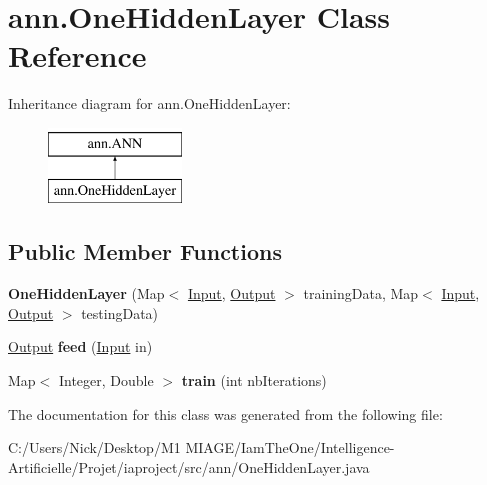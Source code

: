 \hypertarget{classann_1_1_one_hidden_layer}{}\section{ann.\+One\+Hidden\+Layer Class Reference}
\label{classann_1_1_one_hidden_layer}
Inheritance diagram for ann.\+One\+Hidden\+Layer\+:\begin{figure}[H]
\begin{center}
\leavevmode
\includegraphics[height=2.000000cm]{classann_1_1_one_hidden_layer}
\end{center}
\end{figure}
\subsection*{Public Member Functions}
\begin{DoxyCompactItemize}
\item 
\mbox{\label{classann_1_1_one_hidden_layer_a71b47ecdc9b1847d4758cf6614b4a3b0}} 
{\bfseries One\+Hidden\+Layer} (Map$<$ \hyperlink{classann_1_1_input}{Input}, \hyperlink{classann_1_1_output}{Output} $>$ training\+Data, Map$<$ \hyperlink{classann_1_1_input}{Input}, \hyperlink{classann_1_1_output}{Output} $>$ testing\+Data)
\item 
\mbox{\label{classann_1_1_one_hidden_layer_a319db2404483dd4158a7e9266b68f4a4}} 
\hyperlink{classann_1_1_output}{Output} {\bfseries feed} (\hyperlink{classann_1_1_input}{Input} in)
\item 
\mbox{\label{classann_1_1_one_hidden_layer_a054c8821610b8637e8fa3fa319df2d41}} 
Map$<$ Integer, Double $>$ {\bfseries train} (int nb\+Iterations)
\end{DoxyCompactItemize}


The documentation for this class was generated from the following file\+:\begin{DoxyCompactItemize}
\item 
C\+:/\+Users/\+Nick/\+Desktop/\+M1 M\+I\+A\+G\+E/\+Iam\+The\+One/\+Intelligence-\/\+Artificielle/\+Projet/iaproject/src/ann/One\+Hidden\+Layer.\+java\end{DoxyCompactItemize}
